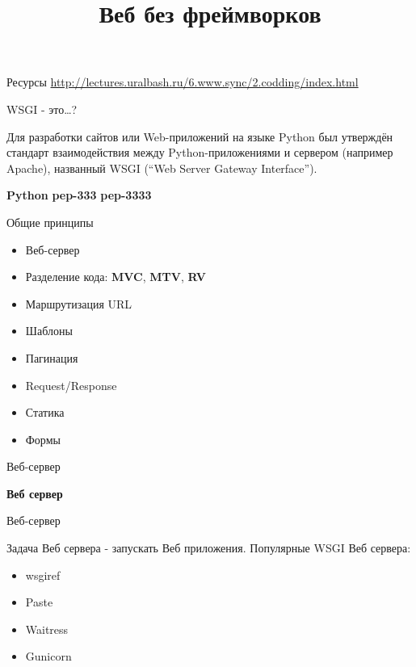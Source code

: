 
\usepackage{array}      %
\usepackage{dirtytalk}  %
\usepackage{tabularx}

\title{Веб без фреймворков}



\frame{\titlepage}

\begin{frame}{Ресурсы}
  \url{http://lectures.uralbash.ru/6.www.sync/2.codding/index.html}
\end{frame}

\begin{frame}{WSGI - это\ldots?}

    Для разработки сайтов или Web-приложений на языке Python был утверждён
    стандарт взаимодействия между Python-приложениями и сервером (например
    Apache), названный WSGI (“Web Server Gateway Interface”).

    \textbf{Python}\newline
    \textbf{pep-333}\newline
    \textbf{pep-3333}\newline

\end{frame}

\begin{frame}{Общие принципы}

  \begin{itemize}
    \item Веб-сервер
    \item Разделение кода: \textbf{MVC}, \textbf{MTV}, \textbf{RV}
    \item Маршрутизация URL
    \item Шаблоны
    \item Пагинация
    \item Request/Response
    \item Статика
    \item Формы
  \end{itemize}

\end{frame}


\begin{frame}{Веб-сервер}

  \textbf{Веб сервер}

\end{frame}


\begin{frame}{Веб-сервер}

  Задача Веб сервера - запускать Веб приложения.\newline\newline
    Популярные WSGI Веб сервера:\newline

  \begin{itemize}
    \item wsgiref
    \item Paste
    \item Waitress
    \item Gunicorn
  \end{itemize}


\end{frame}

